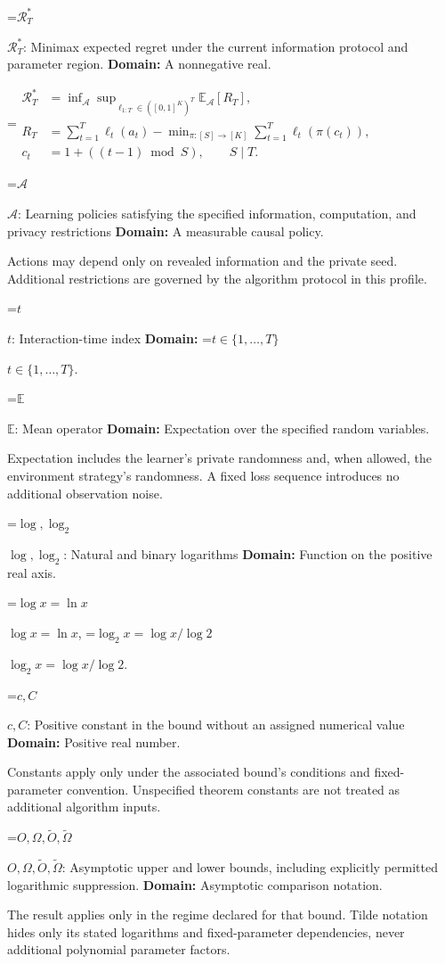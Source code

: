 \documentclass[10pt,a4paper]{article}
\newcommand{\AtlasMath}[1]{\par\begingroup\centering\setbox0=\hbox{$\displaystyle #1$}\ifdim\wd0>1.4\linewidth\typeout{ATLAS WIDE FORMULA: \the\wd0}\fi\ifdim\wd0>\linewidth\resizebox{\linewidth}{!}{\box0}\else\box0\fi\par\endgroup}
\newcommand{\AtlasInlineMath}[1]{\begingroup\setbox0=\hbox{$#1$}\ifdim\wd0>.4\linewidth\endgroup\AtlasMath{#1}\else\endgroup$#1$\fi}
\begin{document}
\AtlasInlineMath{\mathcal R_T^*}: Minimax expected regret under the current information protocol and parameter region. \textbf{Domain:} A nonnegative real.


\AtlasMath{\begin{aligned}\mathcal R_T^*&=\inf_{\mathcal A}\sup_{\ell_{1:T}\in([0,1]^K)^T}\mathbb E_{\mathcal A}[R_T],\\ R_T&=\sum_{t=1}^T\ell_t(a_t)-\min_{\pi:[S]\to[K]}\sum_{t=1}^T\ell_t(\pi(c_t)),\\ c_t&=1+((t-1)\bmod S),\qquad S\mid T.\end{aligned}}


\AtlasInlineMath{\mathcal A}: Learning policies satisfying the specified information, computation, and privacy restrictions \textbf{Domain:} A measurable causal policy.

Actions may depend only on revealed information and the private seed. Additional restrictions are governed by the algorithm protocol in this profile.

\AtlasInlineMath{t}: Interaction-time index \textbf{Domain:} \AtlasInlineMath{t\in\{1,\ldots,T\}}.

\AtlasInlineMath{\mathbb E}: Mean operator \textbf{Domain:} Expectation over the specified random variables.

Expectation includes the learner's private randomness and, when allowed, the environment strategy's randomness. A fixed loss sequence introduces no additional observation noise.

\AtlasInlineMath{\log,\log_2}: Natural and binary logarithms \textbf{Domain:} Function on the positive real axis.

\AtlasInlineMath{\log x=\ln x}, \AtlasInlineMath{\log_2x=\log x/\log2}.

\AtlasInlineMath{c,C}: Positive constant in the bound without an assigned numerical value \textbf{Domain:} Positive real number.

Constants apply only under the associated bound’s conditions and fixed-parameter convention. Unspecified theorem constants are not treated as additional algorithm inputs.

\AtlasInlineMath{O,\Omega,\widetilde O,\widetilde\Omega}: Asymptotic upper and lower bounds, including explicitly permitted logarithmic suppression. \textbf{Domain:} Asymptotic comparison notation.

The result applies only in the regime declared for that bound. Tilde notation hides only its stated logarithms and fixed-parameter dependencies, never additional polynomial parameter factors.
\end{document}
